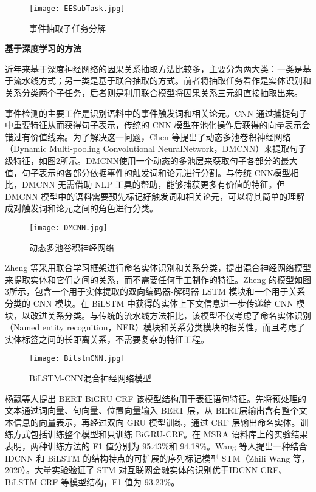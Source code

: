 \documentclass[letterpaper]{article}
\begin{document}
    \begin{figure}[h]
      \centering
      \texttt{[image: EESubTask.jpg]}
      \caption{事件抽取子任务分解}
    \end{figure}

    \textbf{基于深度学习的方法}
    
    近年来基于深度神经网络的因果关系抽取方法比较多，主要分为两大类：一类是基于流水线方式；另一类是基于联合抽取的方式。前者将抽取任务看作是实体识别和关系分类两个子任务，后者则是利用联合模型将因果关系三元组直接抽取出来。
    
    事件检测的主要工作是识别语料中的事件触发词和相关论元。CNN 通过捕捉句子中重要特征从而获得句子表示，传统的 CNN 模型在池化操作后获得的向量表示会错过有价值线索。为了解决这一问题，Chen 等\cite{4}提出了动态多池卷积神经网络（Dynamic Multi-pooling Convolutional NeuralNetwork，DMCNN）来提取句子级特征，如图2所示。DMCNN使用一个动态的多池层来获取句子各部分的最大值，句子表示的各部分依据事件的触发词和论元进行分割。与传统 CNN模型相比，DMCNN 无需借助 NLP 工具的帮助，能够捕获更多有价值的特征。但 DMCNN 模型中的语料需要预先标记好触发词和相关论元，可以将其简单的理解成对触发词和论元之间的角色进行分类。
    
    \begin{figure}[h]
      \centering
      \texttt{[image: DMCNN.jpg]}
      \caption{动态多池卷积神经网络}
    \end{figure}

    Zheng 等\cite{5}采用联合学习框架进行命名实体识别和关系分类，提出混合神经网络模型来提取实体和它们之间的关系，而不需要任何手工制作的特征。Zheng 的模型如图3所示，包含一个用于实体提取的双向编码器-解码器 LSTM 模块和一个用于关系分类的 CNN 模块。在 BiLSTM 中获得的实体上下文信息进一步传递给 CNN 模块，以改进关系分类。与传统的流水线方法相比，该模型不仅考虑了命名实体识别（Named entity recognition，NER）模块和关系分类模块的相关性，而且考虑了实体标签之间的长距离关系，不需要复杂的特征工程。

    \begin{figure}[h]
      \centering
      \texttt{[image: BilstmCNN.jpg]}
      \caption{BiLSTM-CNN混合神经网络模型}
    \end{figure}

    \newpage
    杨飘等人提出 BERT-BiGRU-CRF 该模型结构用于表征语句特征。先将预处理的文本通过词向量、句向量、位置向量输入 BERT 层，从 BERT层输出含有整个文本信息的向量表示，再经过双向 GRU 模型训练，通过 CRF 层输出命名实体。训练方式包括训练整个模型和只训练  BiGRU-CRF。在 MSRA 语料库上的实验结果表明，两种训练方法的 F1 值分别为 95.43\%和 94.18\%。Wang 等人提出一种结合 IDCNN 和 BiLSTM 的结构特点的可扩展的序列标记模型 STM（Zhili Wang 等，2020）。大量实验验证了 STM 对互联网金融实体的识别优于IDCNN-CRF、BiLSTM-CRF 等模型结构，F1 值为 93.23\%。\cite{1}
\end{document}
